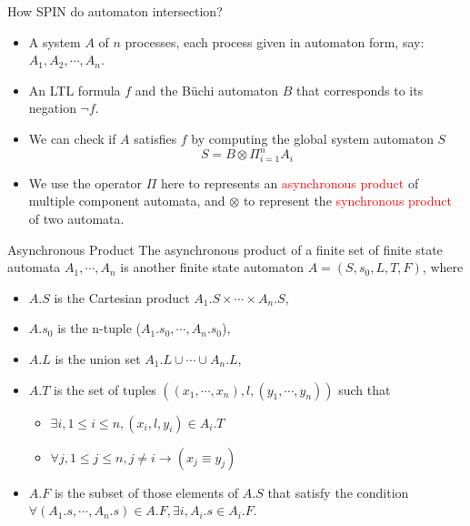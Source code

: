 \documentclass[12pt]{beamer}
\begin{document}
\begin{frame}{How SPIN do automaton intersection?}
\begin{itemize}
	\item A system $A$ of $n$ processes, each process given in automaton form, say: $A_{1}, A_{2}, \cdots, A_{n}$.
	\item An LTL formula $f$ and the Büchi automaton $B$ that corresponds to its negation $\neg f$.
	\item We can check if $A$ satisfies $f$ by computing the global system automaton $S$
	$$S = B \otimes \Pi_{i=1}^{n}A_{i}$$
	\item We use the operator $\Pi$ here to represents an \textcolor{red}{asynchronous product} of multiple component automata, and $\otimes$ to represent the \textcolor{red}{synchronous product} of two automata.
\end{itemize}
\end{frame}

\begin{frame}{Asynchronous Product}
	The asynchronous product of a finite set of finite state automata $A_{1}, \cdots, A_{n}$ is another finite state automaton $A = (S, s_{0}, L, T, F)$, where 
\begin{itemize}
	\item $A.S$ is the Cartesian product $A_{1}.S\times \cdots \times A_{n}.S$,
	\item $A.s_{0}$ is the n-tuple ($A_{1}.s_{0}, \cdots , A_{n}.s_{0}$),
	\item $A.L$ is the union set $A_{1}.L \cup \cdots \cup A_{n}.L$,
	\item $A.T$ is the set of tuples $((x_{1}, \cdots, x_{n}), l, (y_{1}, \cdots, y_{n}))$ such that 
	\begin{itemize}
		\item $\exists i, 1 \leq i \leq n, (x_{i}, l, y_{i})\in A_{i}.T$
		\item $\forall j, 1 \leq j \leq n, j \neq i \rightarrow (x_{j} \equiv y_{j})$
	\end{itemize}
	\item $A.F$ is the subset of those elements of $A.S$ that satisfy the condition $\forall(A_{1}.s, \cdots, A_{n}.s)\in A.F, \exists i, A_{i}.s \in A_{i}.F$.
\end{itemize}
\end{frame}

\end{document}
